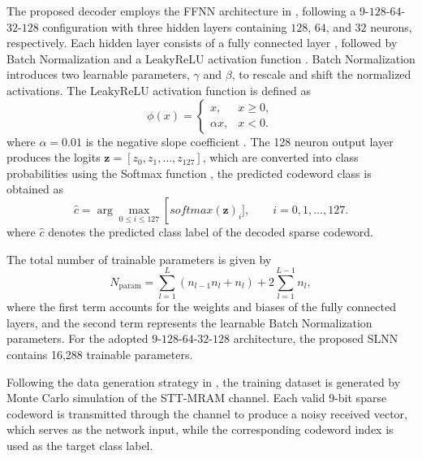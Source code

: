 \documentclass[conference]{IEEEtran}
\begin{document}
The proposed decoder employs the FFNN architecture in \cite{gruber2017deep}, following a $9$-$128$-$64$-$32$-$128$ configuration with three hidden layers containing $128$, $64$, and $32$ neurons, respectively. Each hidden layer consists of a fully connected layer \cite{petersen2021topological}, followed by Batch Normalization \cite{ioffe2015batch} and a LeakyReLU activation function \cite{xu2015empirical}. Batch Normalization introduces two learnable parameters, $\gamma$ and $\beta$, to rescale and shift the normalized activations. The LeakyReLU activation function is defined as
%
\begin{equation}
\phi(x)=
\left\{
\begin{array}{ll}
x, & x \ge 0,\\
\alpha x, & x < 0.
\end{array}
\right.
\label{eq:leakyrelu}
\end{equation}
where $\alpha=0.01$ is the negative slope coefficient \cite{xu2015empirical}. The 128 neuron output layer produces the logits
$\mathbf{z}=[z_0,z_1,\ldots,z_{127}]$, which are converted
into class probabilities using the Softmax function
\cite{martins2016softmax}, the predicted codeword class is obtained as
%
\begin{equation}
\hat{c}
=
\arg\max_{0\leq i\leq127}\operatorname[{softmax}(\mathbf{z})_i],\qquad i=0,1,\ldots,127.
\end{equation}
%
where $\hat{c}$ denotes the predicted class label of the decoded sparse codeword.

The total number of trainable parameters is given by
%
\begin{equation}
N_{\mathrm{param}}
=
\sum_{l=1}^{L}
(n_{l-1}n_l+n_l)
+
2\sum_{l=1}^{L-1}n_l,
\label{eq:param}
\end{equation}
%
where the first term accounts for the weights and biases of the fully connected layers, and the second term represents the learnable Batch Normalization parameters. For the adopted $9$-$128$-$64$-$32$-$128$ architecture, the proposed SLNN contains 16,288 trainable parameters.

Following the data generation strategy in \cite{bennatan2018deep}, the training dataset is generated by Monte Carlo simulation of the STT-MRAM channel. Each valid 9-bit sparse codeword is transmitted through the channel to produce a noisy received vector, which serves as the network input, while the corresponding codeword index is used as the target class label.

\end{document}
